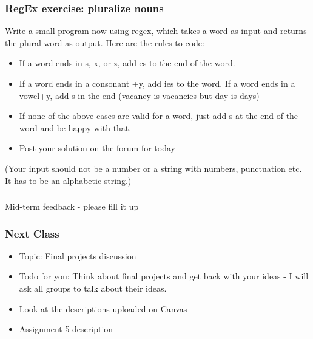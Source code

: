 \documentclass{beamer}
\begin{document}
\begin{frame}
\frametitle{RegEx exercise: pluralize nouns}
Write a small program now using regex, which takes a word as input and returns the plural word as output. Here are the rules to code:
\begin{itemize}
\item If a word ends in s, x, or z, add es to the end of the word.
\item If a word ends in a consonant +y, add ies to the word. If a word ends in a vowel+y, add s in the end (vacancy is vacancies but day is days) 
\item If none of the above cases are valid for a word, just add s at the end of the word and be happy with that. 
\item Post your solution on the forum for today
\end{itemize}
(Your input should not be a number or a string with numbers, punctuation etc. It has to be an alphabetic string.)
\end{frame}

\begin{frame}
\frametitle{}
\begin{center}
Mid-term feedback - please fill it up
\end{center}
\end{frame}

\begin{frame}
\frametitle{Next Class}
\begin{itemize}
\item Topic: Final projects discussion
\item Todo for you: Think about final projects and get back with your ideas - I will ask all groups to talk about their ideas.
\item Look at the descriptions uploaded on Canvas
\item Assignment 5 description
\end{itemize}
\end{frame}
\end{document}

